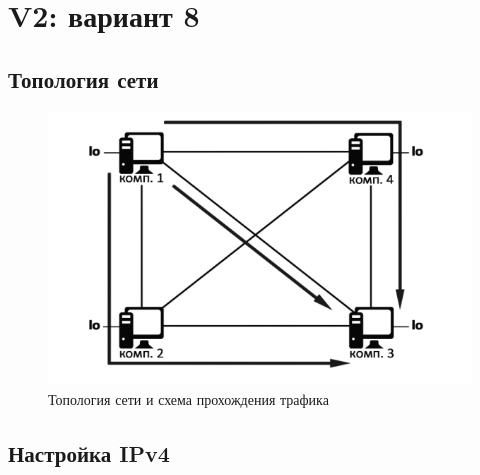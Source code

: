 \documentclass[11pt, a4paper] {ncc}
\begin{document}
\newpage
\section*{V2: вариант 8}

    \subsection*{Топология сети}
        \begin{figure}[h!]
            \includegraphics[scale=0.5]{lo.png}
            \caption{Топология сети и схема прохождения трафика}
        \end{figure}
    
    \subsection*{Настройка IPv4}
\end{document}
